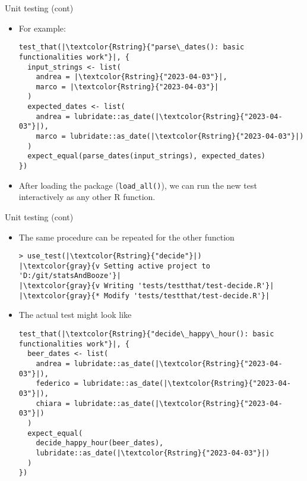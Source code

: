\documentclass[
hyperref={bookmarks=false},
xcolor={dvipsnames,svgnames*,x11names*}, 
12pt
]{beamer}
\begin{document}
\begin{frame}[fragile]{Unit testing (cont)}
\vspace{-0.5cm}
\begin{itemize}
\itemsep 2ex
\item For example: 
\begin{lstlisting}
test_that(|\textcolor{Rstring}{"parse\_dates(): basic functionalities work"}|, {
  input_strings <- list(
    andrea = |\textcolor{Rstring}{"2023-04-03"}|,
    marco = |\textcolor{Rstring}{"2023-04-03"}|
  )
  expected_dates <- list(
    andrea = lubridate::as_date(|\textcolor{Rstring}{"2023-04-03"}|),
    marco = lubridate::as_date(|\textcolor{Rstring}{"2023-04-03"}|)
  )
  expect_equal(parse_dates(input_strings), expected_dates)
})
\end{lstlisting}
\item After loading the package (\texttt{load\_all()}), we can run the new test interactively as any other R function. 
\end{itemize}
\end{frame}

\begin{frame}[fragile]{Unit testing (cont)}
\vspace{-0.5cm}
\begin{itemize}
\itemsep 2ex
\item The same procedure can be repeated for the other function
\begin{lstlisting}
> use_test(|\textcolor{Rstring}{"decide"}|)
|\textcolor{gray}{v Setting active project to 'D:/git/statsAndBooze'}|
|\textcolor{gray}{v Writing 'tests/testthat/test-decide.R'}|
|\textcolor{gray}{* Modify 'tests/testthat/test-decide.R'}|
\end{lstlisting}
\item The actual test might look like
\begin{lstlisting}
test_that(|\textcolor{Rstring}{"decide\_happy\_hour(): basic functionalities work"}|, {
  beer_dates <- list(
    andrea = lubridate::as_date(|\textcolor{Rstring}{"2023-04-03"}|),
	federico = lubridate::as_date(|\textcolor{Rstring}{"2023-04-03"}|),
	chiara = lubridate::as_date(|\textcolor{Rstring}{"2023-04-03"}|)
  )
  expect_equal(
    decide_happy_hour(beer_dates), 
	lubridate::as_date(|\textcolor{Rstring}{"2023-04-03"}|)
  )
})
\end{lstlisting}
\end{itemize}
\end{frame}
\end{document}
